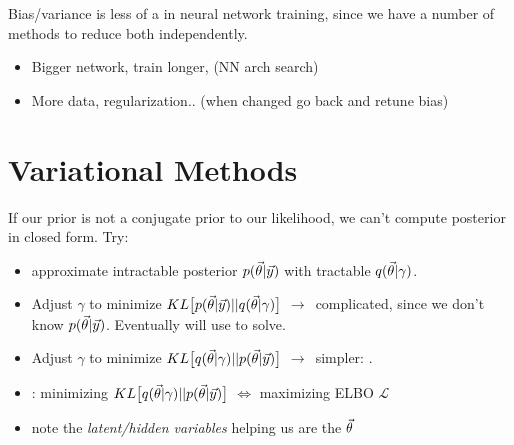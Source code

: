 \documentclass[11pt]{article}
\begin{document}
Bias/variance is less of a  in neural network training, since we have a
number of methods to reduce both independently.
\begin{itemize}
  \item {} Bigger network, train longer, (NN arch
  search)
  \item {} More data, regularization.. (when changed
  go back and retune bias)
\end{itemize}


\section{Variational Methods}
\label{sec:var_meth}

If our prior is not a conjugate prior to our likelihood, we can't compute posterior in
closed form. Try:

\begin{itemize}
  \item approximate intractable posterior $p(\vec{\theta} | \vec{y})$ with tractable
  $q(\vec{\theta} | \gamma)$.
  \item Adjust $\gamma$ to minimize
  $KL \big[p(\vec{\theta} | \vec{y}) || q(\vec{\theta} | \gamma)\big]$ $\to\,$ complicated,
  since we don't know $p(\vec{\theta} | \vec{y})$. Eventually will use  to solve.
  \item Adjust $\gamma$ to minimize
  $KL \big[q(\vec{\theta} | \gamma) || p(\vec{\theta} | \vec{y})\big]$ $\to\,$ simpler:
  .
  \item {}: minimizing
  $KL \big[q(\vec{\theta} | \gamma) || p(\vec{\theta} | \vec{y})\big]$ $\iff$ maximizing ELBO
  $\mathcal{L}$
  \item note the \emph{latent/hidden variables} helping us are the $\vec{\theta}$
\end{itemize}
\end{document}
